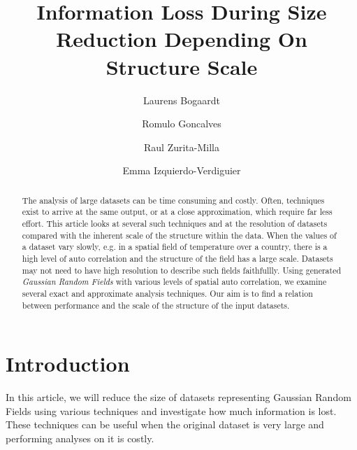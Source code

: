 \documentclass{acm_proc_article-sp}
\begin{document}
\title{\textbf{Information Loss During Size Reduction Depending On Structure Scale}}

\author[1]{Laurens Bogaardt}
\author[1]{Romulo Goncalves}
\author[2]{Raul Zurita-Milla}
\author[2,3]{Emma Izquierdo-Verdiguier}


\date{} %
\maketitle\thispagestyle{empty} %

\begin{abstract}
The analysis of large datasets can be time consuming and costly. Often, techniques exist to arrive at the same output, or at a close approximation, which require far less effort. This article looks at several such techniques and at the resolution of datasets compared with the inherent scale of the structure within the data. When the values of a dataset vary slowly, e.g. in a spatial field of temperature over a country, there is a high level of auto correlation and the structure of the field has a large scale. Datasets may not need to have high resolution to describe such fields faithfullly. Using generated \textit{Gaussian Random Fields} with various levels of spatial auto correlation, we examine several exact and approximate analysis techniques. Our aim is to find a relation between performance and the scale of the structure of the input datasets.
\end{abstract}

\section{Introduction}
\label{sec:Introduction}

In this article, we will reduce the size of datasets representing Gaussian Random Fields using various techniques and investigate how much information is lost. These techniques can be useful when the original dataset is very large and performing analyses on it is costly.
\end{document}
